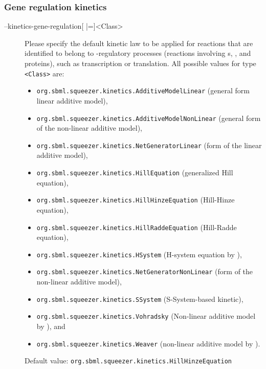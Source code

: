 \subsubsection{Gene regulation kinetics}
\begin{description}
\item[--kinetics-gene-regulation{[} |={]}<Class>]
  Please specify the default kinetic law to be applied for reactions
  that are identified to belong to {\gene}-regulatory processes (reactions
  involving {\gene}s, \RNA, and proteins), such as transcription or
  translation.
  All possible values for type \texttt{<Class>} are:
  \begin{itemize}
  \item\texttt{org.sbml.squeezer.kinetics.AdditiveModelLinear} (general form linear additive model),
  \item\texttt{org.sbml.squeezer.kinetics.AdditiveModelNonLinear} (general form of the non-linear additive model),
  \item\texttt{org.sbml.squeezer.kinetics.NetGeneratorLinear} (\NetGenerator form of the linear additive model),
  \item\texttt{org.sbml.squeezer.kinetics.HillEquation} (generalized Hill equation),
  \item\texttt{org.sbml.squeezer.kinetics.HillHinzeEquation} (Hill-Hinze equation), 
  \item\texttt{org.sbml.squeezer.kinetics.HillRaddeEquation} (Hill-Radde equation),
  \item\texttt{org.sbml.squeezer.kinetics.HSystem} (H-system equation by \citealp{Spieth2006}),
  \item\texttt{org.sbml.squeezer.kinetics.NetGeneratorNonLinear} (\NetGenerator form of the non-linear additive model),
  \item\texttt{org.sbml.squeezer.kinetics.SSystem} (S-System-based kinetic),
  \item\texttt{org.sbml.squeezer.kinetics.Vohradsky} (Non-linear additive model by \citealp*{Vu2007}), and
  \item\texttt{org.sbml.squeezer.kinetics.Weaver} (non-linear additive model by \citealp{Weaver1999}).
  \end{itemize}
  Default value: \texttt{org.sbml.squeezer.kinetics.HillHinzeEquation}


\end{description}
